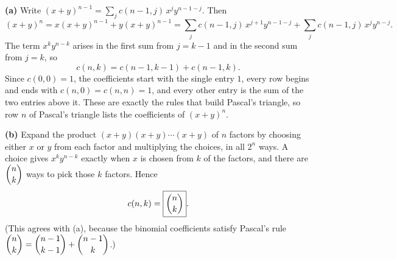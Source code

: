 \textbf{(a)} Write $(x+y)^{n-1}=\sum_j c(n-1,j)\,x^jy^{n-1-j}$. Then
\[(x+y)^n=x(x+y)^{n-1}+y(x+y)^{n-1}=\sum_j c(n-1,j)\,x^{j+1}y^{n-1-j}+\sum_j c(n-1,j)\,x^jy^{n-j}.\]
The term $x^ky^{n-k}$ arises in the first sum from $j=k-1$ and in the second sum from $j=k$, so
\[c(n,k)=c(n-1,k-1)+c(n-1,k).\]
Since $c(0,0)=1$, the coefficients start with the single entry $1$, every row begins and ends with $c(n,0)=c(n,n)=1$, and every other entry is the sum of the two entries above it. These are exactly the rules that build Pascal's triangle, so row $n$ of Pascal's triangle lists the coefficients of $(x+y)^n$.

\textbf{(b)} Expand the product $(x+y)(x+y)\cdots(x+y)$ of $n$ factors by choosing either $x$ or $y$ from each factor and multiplying the choices, in all $2^n$ ways. A choice gives $x^ky^{n-k}$ exactly when $x$ is chosen from $k$ of the factors, and there are $\dbinom nk$ ways to pick those $k$ factors. Hence
\[c(n,k)=\boxed{\dbinom nk}.\]
(This agrees with (a), because the binomial coefficients satisfy Pascal's rule $\dbinom nk=\dbinom{n-1}{k-1}+\dbinom{n-1}{k}$.)
